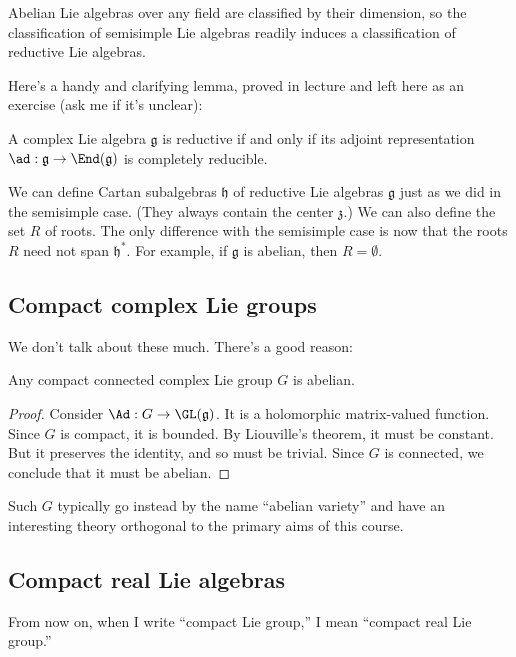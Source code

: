 \documentclass[reqno]{amsart} 
\begin{document}
Abelian Lie algebras over any field are classified by their dimension, so the classification of semisimple Lie algebras readily induces a classification of reductive Lie algebras.

Here's a handy and clarifying lemma, proved in lecture and left here as an exercise (ask me if it's unclear):
\begin{lemma}\label{lem:reductive-iff-reducible}
  A complex Lie algebra $\mathfrak{g}$ is reductive if and only if its adjoint representation $\ad : \mathfrak{g} \rightarrow \End(\mathfrak{g})$ is completely reducible.
\end{lemma}

We can define Cartan subalgebras $\mathfrak{h}$ of reductive Lie algebras $\mathfrak{g}$ just as we did in the semisimple case.  (They always contain the center $\mathfrak{z}$.)  We can also define the set $R$ of roots.  The only difference with the semisimple case is now that the roots $R$ need not span $\mathfrak{h}^*$.  For example, if $\mathfrak{g}$ is abelian, then $R = \emptyset$.

\subsection{Compact complex Lie groups}
\label{sec:orgdfd4c01}
We don't talk about these much.  There's a good reason:
\begin{theorem}
  Any compact connected complex Lie group $G$ is abelian.
\end{theorem}
\begin{proof}
  Consider $\Ad : G \rightarrow \GL(\mathfrak{g})$.  It is a holomorphic matrix-valued function.  Since $G$ is compact, it is bounded.  By Liouville's theorem, it must be constant.  But it preserves the identity, and so must be trivial.  Since $G$ is connected, we conclude that it must be abelian.
\end{proof}
Such $G$ typically go instead by the name ``abelian variety'' and have an interesting theory orthogonal to the primary aims of this course.

\subsection{Compact real Lie algebras}
\label{sec:orgc85f06b}
From now on, when I write ``compact Lie group,'' I mean ``compact real Lie group.''
\end{document}
